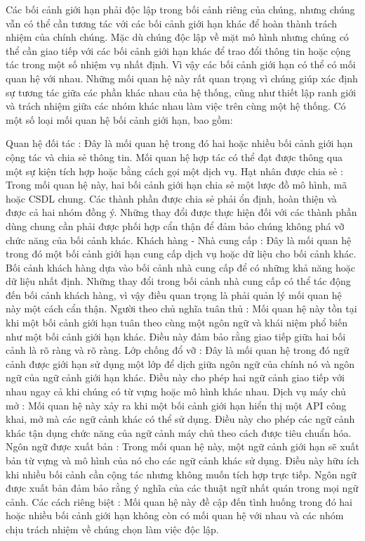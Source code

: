 Các bối cảnh giới hạn phải độc lập trong bối cảnh riêng của chúng, nhưng chúng vẫn có thể cần tương tác với các bối cảnh giới hạn khác để hoàn thành trách nhiệm của chính chúng. Mặc dù chúng độc lập về mặt mô hình nhưng chúng có thể cần giao tiếp với các bối cảnh giới hạn khác để trao đổi thông tin hoặc cộng tác trong một số nhiệm vụ nhất định. Vì vậy các bối cảnh giới hạn có thể có mối quan hệ với nhau. Những mối quan hệ này rất quan trọng vì chúng giúp xác định sự tương tác giữa các phần khác nhau của hệ thống, cũng như thiết lập ranh giới và trách nhiệm giữa các nhóm khác nhau làm việc trên cùng một hệ thống. Có một số loại mối quan hệ bối cảnh giới hạn, bao gồm:

Quan hệ đối tác : Đây là mối quan hệ trong đó hai hoặc nhiều bối cảnh giới hạn cộng tác và chia sẻ thông tin. Mối quan hệ hợp tác có thể đạt được thông qua một sự kiện tích hợp hoặc bằng cách gọi một dịch vụ.
Hạt nhân được chia sẻ : Trong mối quan hệ này, hai bối cảnh giới hạn chia sẻ một lược đồ mô hình, mã hoặc CSDL chung. Các thành phần được chia sẻ phải ổn định, hoàn thiện và được cả hai nhóm đồng ý. Những thay đổi được thực hiện đối với các thành phần dùng chung cần phải được phối hợp cẩn thận để đảm bảo chúng không phá vỡ chức năng của bối cảnh khác.
Khách hàng - Nhà cung cấp : Đây là mối quan hệ trong đó một bối cảnh giới hạn cung cấp dịch vụ hoặc dữ liệu cho bối cảnh khác. Bối cảnh khách hàng dựa vào bối cảnh nhà cung cấp để có những khả năng hoặc dữ liệu nhất định. Những thay đổi trong bối cảnh nhà cung cấp có thể tác động đến bối cảnh khách hàng, vì vậy điều quan trọng là phải quản lý mối quan hệ này một cách cẩn thận.
Người theo chủ nghĩa tuân thủ : Mối quan hệ này tồn tại khi một bối cảnh giới hạn tuân theo cùng một ngôn ngữ và khái niệm phổ biến như một bối cảnh giới hạn khác. Điều này đảm bảo rằng giao tiếp giữa hai bối cảnh là rõ ràng và rõ ràng.
Lớp chống đổ vỡ : Đây là mối quan hệ trong đó ngữ cảnh được giới hạn sử dụng một lớp để dịch giữa ngôn ngữ của chính nó và ngôn ngữ của ngữ cảnh giới hạn khác. Điều này cho phép hai ngữ cảnh giao tiếp với nhau ngay cả khi chúng có từ vựng hoặc mô hình khác nhau.
Dịch vụ máy chủ mở : Mối quan hệ này xảy ra khi một bối cảnh giới hạn hiển thị một API công khai, mở mà các ngữ cảnh khác có thể sử dụng. Điều này cho phép các ngữ cảnh khác tận dụng chức năng của ngữ cảnh máy chủ theo cách được tiêu chuẩn hóa.
Ngôn ngữ được xuất bản : Trong mối quan hệ này, một ngữ cảnh giới hạn sẽ xuất bản từ vựng và mô hình của nó cho các ngữ cảnh khác sử dụng. Điều này hữu ích khi nhiều bối cảnh cần cộng tác nhưng không muốn tích hợp trực tiếp. Ngôn ngữ được xuất bản đảm bảo rằng ý nghĩa của các thuật ngữ nhất quán trong mọi ngữ cảnh.
Các cách riêng biệt : Mối quan hệ này đề cập đến tình huống trong đó hai hoặc nhiều bối cảnh giới hạn không còn có mối quan hệ với nhau và các nhóm chịu trách nhiệm về chúng chọn làm việc độc lập.

